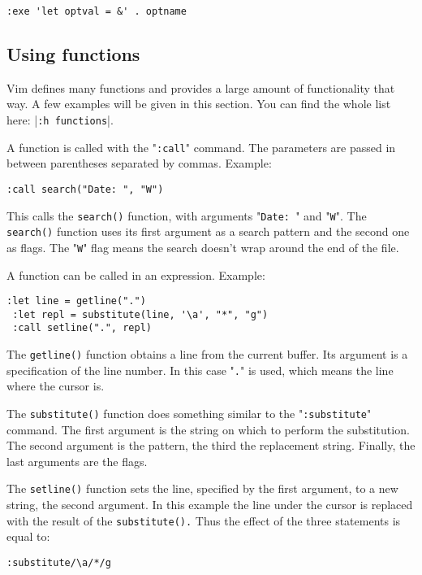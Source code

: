 \begin{Verbatim}[samepage=true]
 :exe 'let optval = &' . optname
\end{Verbatim}

\subsection{Using functions}
Vim defines many functions and provides a large amount of functionality that way.
A few examples will be given in this section.
You can find the whole list here: |\texttt{:h functions}|.

A function is called with the "\texttt{:call}" command.
The parameters are passed in between parentheses separated by commas.
Example:

\begin{Verbatim}[samepage=true]
 :call search("Date: ", "W")
\end{Verbatim}

This calls the \texttt{search()} function, with arguments "\texttt{Date: }" and "\texttt{W}".
The \texttt{search()} function uses its first argument as a search pattern and the second one as flags.
The "\texttt{W}" flag means the search doesn't wrap around the end of the file.

A function can be called in an expression.
Example:

\begin{Verbatim}[samepage=true]
 :let line = getline(".")
 :let repl = substitute(line, '\a', "*", "g")
 :call setline(".", repl)
\end{Verbatim}

The \texttt{getline()} function obtains a line from the current buffer.
Its argument is a specification of the line number.
In this case "\texttt{.}" is used, which means the line where the cursor is.

The \texttt{substitute()} function does something similar to the "\texttt{:substitute}" command.
The first argument is the string on which to perform the substitution.
The second argument is the pattern, the third the replacement string.
Finally, the last arguments are the flags.

The \texttt{setline()} function sets the line, specified by the first argument, to a new string, the second argument.
In this example the line under the cursor is replaced with the result of the \texttt{substitute().}  Thus the effect of the three statements is equal to:

\begin{Verbatim}[samepage=true]
 :substitute/\a/*/g
\end{Verbatim}

